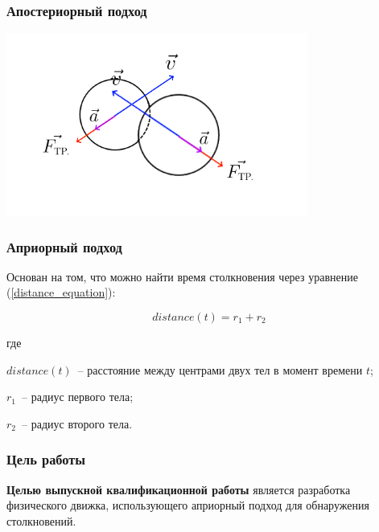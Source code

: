 \documentclass[xetex,aspectratio=43]{beamer}
\newenvironment{Underequation}{
    \small
    \noindent
    где
    \hspace{-1.45ex}
    \setlength{\parindent}{3.5ex}
}{}
\begin{document}
\begin{frame}
    \frametitle{Апостериорный подход}

    \includegraphics[height=6cm]{body_aposteriori}
\end{frame}

\begin{frame}
    \frametitle{Априорный подход}

    Основан на том, что можно найти время столкновения через уравнение (\ref{distance_equation}):

    \begin{equation}\label{distance_equation}
        distance(t) = r_1 + r_2
    \end{equation}

    \begin{Underequation}
        \(distance(t)\)~-- расстояние между центрами двух тел в момент времени \(t\);

        \(r_1\)~-- радиус первого тела;

        \(r_2\)~-- радиус второго тела.
    \end{Underequation}

\end{frame}

\begin{frame}
    \frametitle{Цель работы}

    \textbf{Целью выпускной квалификационной работы} является
    разработка физического движка, использующего априорный подход для обнаружения столкновений.

\end{frame}
\end{document}
